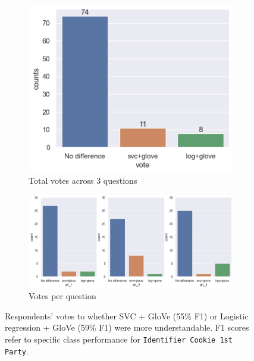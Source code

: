 \begin{figure}[!ht]
  \centering
    \begin{subfigure}[b]{0.75\textwidth}
      \includegraphics[width=1\linewidth]{figures/part4_votes.png}
      \caption{Total votes across 3 questions}
    \end{subfigure}
    \hfill
    \centering
    \begin{subfigure}[b]{1\textwidth}
      \includegraphics[width=1\linewidth]{figures/part_4_votes_1.png}
      \caption{Votes per question}
    \end{subfigure}
    \caption{Respondents' votes to whether SVC + GloVe (55\% F1) or Logistic regression + GloVe (59\% F1) were more understandable. F1 scores refer to specific class performance for \texttt{Identifier Cookie 1st Party}.}
    \label{fig:part4}
\end{figure}

